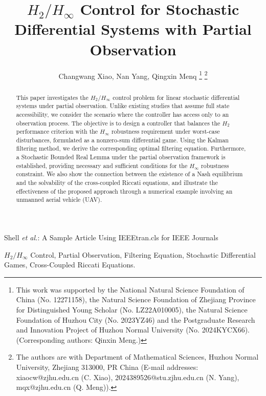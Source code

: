 \documentclass[lettersize,journal]{IEEEtran}
\theoremstyle{plain}
\theoremstyle{definition}
\begin{document}
\title{$H_2/H_{\infty}$ Control for Stochastic Differential Systems with Partial Observation}

\author{Changwang Xiao, Nan Yang, Qingxin Menq
\thanks{This work was supported by the National Natural Science Foundation of China (No. 12271158), the Natural Science Foundation of Zhejiang Province for Distinguished Young Scholar (No. LZ22A010005), the Natural Science Foundation of Huzhou City (No. 2023YZ46) and the Postgraduate Research and Innovation Project of Huzhou Normal University (No. 2024KYCX66). (Corresponding authors: Qinxin Meng.)}%
\thanks{The authors are with Department of Mathematical Sciences, Huzhou Normal University, Zhejiang 313000, PR China (E-mail addresses: xiaocw@zjhu.edu.cn (C. Xiao), 2024389526@stu.zjhu.edu.cn (N. Yang), mqx@zjhu.edu.cn (Q. Meng)).}}

%
{Shell \MakeLowercase{\textit{et al.}}: A Sample Article Using IEEEtran.cls for IEEE Journals}


\maketitle

\begin{abstract}
	This paper investigates the $H_{2}/H_{\infty}$ control problem for linear stochastic differential systems under partial observation. Unlike existing studies that assume full state accessibility, we consider the scenario where the controller has access only to an observation process. The objective is to design a controller that balances the $H_2$ performance criterion with the $H_\infty$ robustness requirement under worst-case disturbances, formulated as a nonzero-sum differential game. Using the Kalman filtering method, we derive the corresponding optimal filtering equation. Furthermore, a Stochastic Bounded Real Lemma under the partial observation framework is established, providing necessary and sufficient conditions for the $H_\infty$ robustness constraint. We also show the connection between the existence of a Nash equilibrium and the solvability of the cross-coupled Riccati equations, and illustrate the effectiveness of the proposed approach through a numerical example involving an unmanned aerial vehicle (UAV).
\end{abstract}
\begin{IEEEkeywords}
    $H_2/H_{\infty}$ Control, Partial Observation, Filtering Equation, Stochastic Differential Games, Cross-Coupled Riccati Equations.
\end{IEEEkeywords}
\end{document}
